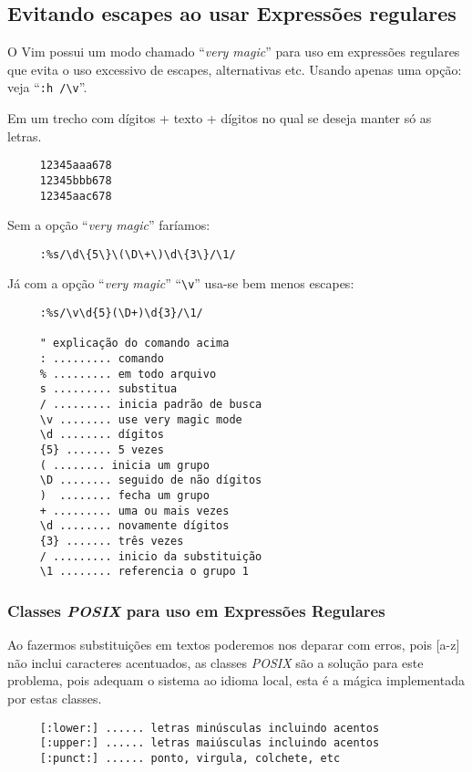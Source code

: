 \subsection{Evitando escapes ao usar Expressões regulares}

O Vim possui um modo chamado ``{\em very magic}'' para uso em expressões
regulares que evita o uso excessivo de escapes, alternativas etc. Usando apenas
uma opção: veja ``\verb+:h /\v+''.

Em um trecho com dígitos + texto + dígitos
no qual se deseja manter só as letras.

\begin{verbatim}
     12345aaa678
     12345bbb678
     12345aac678
\end{verbatim}

Sem a opção ``{\em very magic}'' faríamos:

\begin{verbatim}
     :%s/\d\{5\}\(\D\+\)\d\{3\}/\1/
\end{verbatim}

Já com a opção ``{\em very magic}'' ``\verb+\v+'' usa-se bem menos escapes:

\begin{verbatim}
     :%s/\v\d{5}(\D+)\d{3}/\1/

     " explicação do comando acima
     : ......... comando
     % ......... em todo arquivo
     s ......... substitua
     / ......... inicia padrão de busca
     \v ........ use very magic mode
     \d ........ dígitos
     {5} ....... 5 vezes 
     ( ........ inicia um grupo
     \D ........ seguido de não dígitos
     )  ........ fecha um grupo     
     + ......... uma ou mais vezes
     \d ........ novamente dígitos
     {3} ....... três vezes 
     / ......... inicio da substituição
     \1 ........ referencia o grupo 1
\end{verbatim}

\subsubsection{Classes {\em POSIX} para uso em Expressões Regulares}

Ao fazermos substituições em textos poderemos nos deparar com
erros, pois [a-z] não inclui caracteres acentuados, as classes
{\em POSIX} são a solução para este problema, pois adequam o
sistema ao idioma local, esta é a mágica implementada por estas classes.

\begin{verbatim}
     [:lower:] ...... letras minúsculas incluindo acentos
     [:upper:] ...... letras maiúsculas incluindo acentos
     [:punct:] ...... ponto, virgula, colchete, etc
\end{verbatim}

